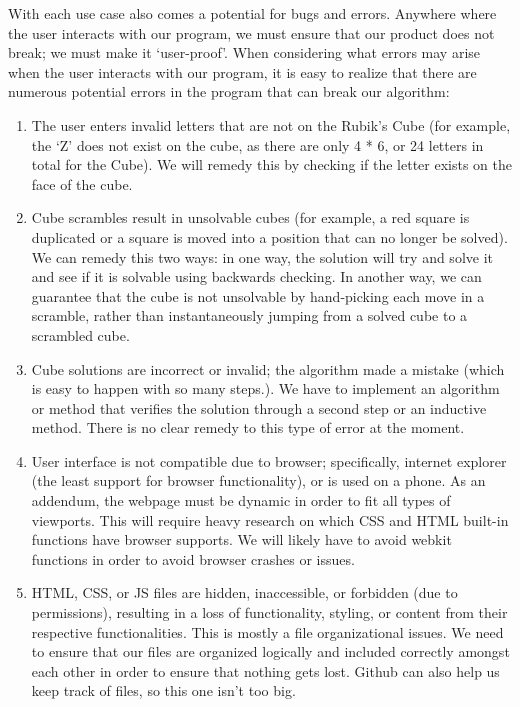 \documentclass[12pt]{article}
\begin{document}
\par With each use case also comes a potential for bugs and errors. Anywhere where the user interacts with our program, we must ensure that our product does not break; we must make it ‘user-proof’. When considering what errors may arise when the user interacts with our program, it is easy to realize that there are numerous potential errors in the program that can break our algorithm:

\begin{enumerate}
\item The user enters invalid letters that are not on the Rubik’s Cube (for example, the ‘Z’ does not exist on the cube, as there are only 4 * 6, or 24 letters in total for the Cube). We will remedy this by checking if the letter exists on the face of the cube.
\item Cube scrambles result in unsolvable cubes (for example, a red square is duplicated or a square is moved into a position that can no longer be solved). We can remedy this two ways: in one way, the solution will try and solve it and see if it is solvable using backwards checking. In another way, we can guarantee that the cube is not unsolvable by hand-picking each move in a scramble, rather than instantaneously jumping from a solved cube to a scrambled cube.
\item Cube solutions are incorrect or invalid; the algorithm made a mistake (which is easy to happen with so many steps.). We have to implement an algorithm or method that verifies the solution through a second step or an inductive method. There is no clear remedy to this type of error at the moment.
\item User interface is not compatible due to browser; specifically, internet explorer (the least support for browser functionality), or is used on a phone. As an addendum, the webpage must be dynamic in order to fit all types of viewports. This will require heavy research on which CSS and HTML built-in functions have browser supports. We will likely have to avoid webkit functions in order to avoid browser crashes or issues.
\item HTML, CSS, or JS files are hidden, inaccessible, or forbidden (due to permissions), resulting in a loss of functionality, styling, or content from their respective functionalities. This is mostly a file organizational issues. We need to ensure that our files are organized logically and included correctly amongst each other in order to ensure that nothing gets lost. Github can also help us keep track of files, so this one isn’t too big.

\end{enumerate}
\end{document}
